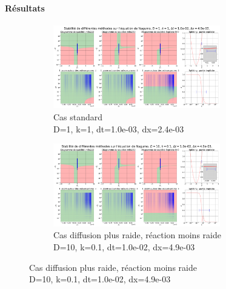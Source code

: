     \paragraph{Résultats}
    \begin{figure}[htbp]
        \centering
        
        \begin{subfigure}{\textwidth}
            \centering
            \includegraphics[width=0.8\textwidth]{media/4_travail/2_nagumo/stabilite/STABILITE_D1_k1_dt1.0e-02_dx4.9e-03.png}
            \caption{Cas standard\\D=1, k=1, dt=1.0e-03, dx=2.4e-03}
            \label{fig:stabilite_nagumo_a}
        \end{subfigure}
        
        \vspace{0.5cm} %
        
        \begin{subfigure}{\textwidth}
            \centering
            \includegraphics[width=0.8\textwidth]{media/4_travail/2_nagumo/stabilite/STABILITE_D10_k0.1_dt1.0e-02_dx4.9e-03.png}
            \caption{Cas diffusion plus raide, réaction moins raide\\D=10, k=0.1, dt=1.0e-02, dx=4.9e-03}
            \label{fig:stabilite_nagumo_b}
        \end{subfigure}


\end{figure}
